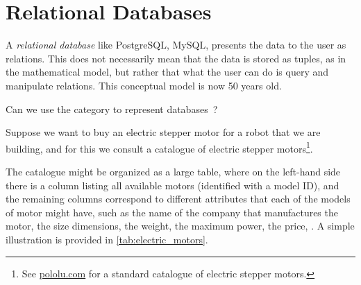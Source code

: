 
\section{Relational Databases}
\label{sec:relational-databases}


    A \emph{relational database} like PostgreSQL, MySQL, \etc presents the data to the user as relations.
    This does not necessarily mean that the data is stored as tuples, as in the mathematical model, but rather that what the user can do is query and manipulate relations.
    This conceptual model is now 50 years old.

    Can we use the category \Rel to represent databases~\cite{codd2002relational}?

    Suppose we want to buy an electric stepper motor for a robot that we are building, and for this we consult a catalogue of electric stepper motors\footnote{See \href{https://www.pololu.com/category/87/stepper-motors}{pololu.com} for a standard catalogue of electric stepper motors.
    }.

    The catalogue might be organized as a large table, where on the left-hand side there is a column listing all available motors (identified with a model ID), and the remaining columns correspond to different attributes that each of the models of motor might have, such as the name of the company that manufactures the motor, the size dimensions, the weight, the maximum power, the price, \etc.
    A simple illustration is provided in \cref{tab:electric_motors}.

